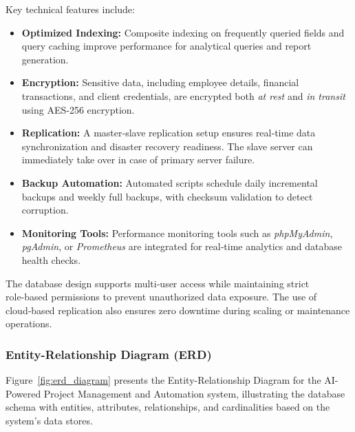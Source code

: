 \documentclass[12pt,a4paper]{article}
\begin{document}
Key technical features include:
\begin{itemize}
    \item \textbf{Optimized Indexing:} Composite indexing on frequently queried fields and query caching improve performance for analytical queries and report generation.
    
    \item \textbf{Encryption:} Sensitive data, including employee details, financial transactions, and client credentials, are encrypted both \textit{at rest} and \textit{in transit} using AES‑256 encryption.
    
    \item \textbf{Replication:} A master‑slave replication setup ensures real‑time data synchronization and disaster recovery readiness.  The slave server can immediately take over in case of primary server failure.
    
    \item \textbf{Backup Automation:} Automated scripts schedule daily incremental backups and weekly full backups, with checksum validation to detect corruption.
    
    \item \textbf{Monitoring Tools:} Performance monitoring tools such as \textit{phpMyAdmin}, \textit{pgAdmin}, or \textit{Prometheus} are integrated for real‑time analytics and database health checks.
\end{itemize}

The database design supports multi‑user access while maintaining strict role‑based permissions to prevent unauthorized data exposure.  The use of cloud‑based replication also ensures zero downtime during scaling or maintenance operations.

\subsubsection{Entity-Relationship Diagram (ERD)}
Figure~\ref{fig:erd_diagram} presents the Entity-Relationship Diagram for the AI-Powered Project Management and Automation system, illustrating the database schema with entities, attributes, relationships, and cardinalities based on the system's data stores.
\end{document}
